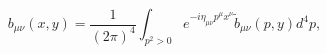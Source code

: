 \begin{equation}\label{fourier}
b_{\mu\nu}(x,y)=\frac{1}{(2\pi)^4}\int_{p^2>0} e^{-i\eta_{\mu\nu}p^\mu
x^\nu}\tilde b_{\mu\nu}(p,y)d^4p,
\end{equation}

